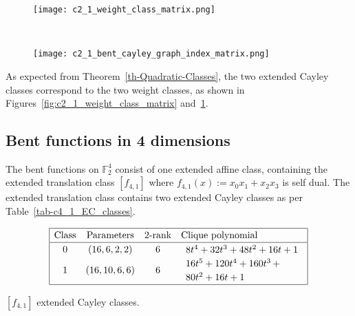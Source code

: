 \documentclass[12pt,a4paper]{article}
\newcommand{\mb}[1]{\mathbb{#1}}
\newcommand{\F}{\mb{F}}
\begin{document}
\begin{figure}[!ht]
\centering
\begin{minipage}{.48\textwidth}
  \centering
  \texttt{[image: c2\_1\_weight\_class\_matrix.png]}
  \label{fig:c2_1_weight_class_matrix}
\end{minipage}%
~~~~
\begin{minipage}{.48\textwidth}
  \centering
  \texttt{[image: c2\_1\_bent\_cayley\_graph\_index\_matrix.png]}
  \label{fig:c2_1_bent_cayley_graph_index_matrix}
\end{minipage}
\end{figure}
As expected from Theorem~\ref{th-Quadratic-Classes},
the two extended Cayley classes correspond to the two weight classes,
as shown in Figures~\ref{fig:c2_1_weight_class_matrix} and~\ref{fig:c2_1_bent_cayley_graph_index_matrix}.

\subsection{Bent functions in 4 dimensions}
%
The bent functions on $\F_2^4$ consist of one extended affine class, containing the extended translation class $[f_{4,1}]$ where
$f_{4,1}(x) := x_0 x_1 + x_2 x_3$ is self dual.
The extended translation class contains two extended Cayley classes as per Table~\ref{tab-c4_1_EC_classes}.
\begin{table}[!bhpt] %
\small{
\begin{align*}
\def\arraystretch{1.2}
\begin{array}{|cccl|}
\hline
\text{Class} &
\text{Parameters} &
\text{2-rank} &
\text{Clique polynomial}
\\
\hline
0 &
(16, 6, 2, 2) &
6 &
\begin{array}{l}
8t^{4} + 32t^{3} + 48t^{2} + 16t + 1
\end{array}
\\
1 &
(16, 10, 6, 6) &
6 &
\begin{array}{l}
16t^{5} + 120t^{4} + 160t^{3}
\,+
\\
 80t^{2} + 16t + 1
\end{array}
\\
\hline
\end{array}
\end{align*}
}
\caption{$[f_{4,1}]$ extended Cayley classes.}
\label{tab-c4_1_EC_classes}
\end{table}
\end{document}
